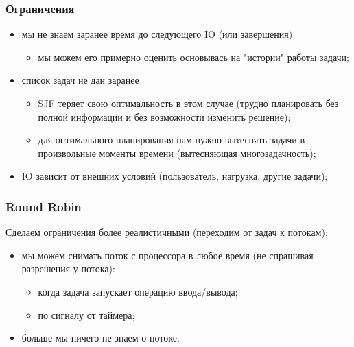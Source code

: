 \begin{frame}
\frametitle{Ограничения}

\begin{itemize}
  \item<1-> мы не знаем заранее время до следующего IO (или завершения)
        \begin{itemize}
          \item мы можем его примерно оценить основывась на "истории" работы
                задачи;
        \end{itemize}
  \item<2-> список задач не дан заранее
        \begin{itemize}
          \item SJF теряет свою оптимальность в этом случае (трудно планировать
                без полной информации и без возможности изменить решение);
          \item для оптимального планирования нам нужно вытеснять задачи в
                произвольные моменты времени (вытесняющая многозадачность);
        \end{itemize}
  \item<3-> IO зависит от внешних условий (пользователь, нагрузка, другие
            задачи);
\end{itemize}
\end{frame}

\begin{frame}
\frametitle{Round Robin}

Сделаем ограничения более реалистичными (переходим от задач к потокам):
\begin{itemize}
  \item<1-> мы можем снимать поток с процессора в любое время (не спрашивая
        разрешения у потока):
        \begin{itemize}
          \item когда задача запускает операцию ввода/вывода;
          \item по сигналу от таймера;
        \end{itemize}
  \item<2-> больше мы ничего не знаем о потоке.
\end{itemize}
\end{frame}

